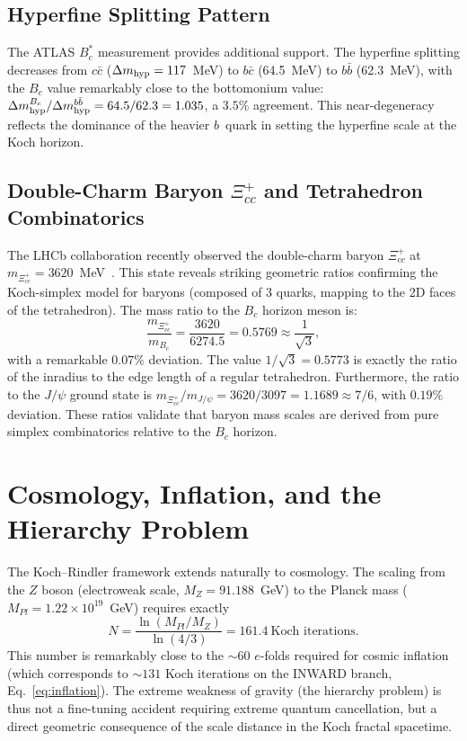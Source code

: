 \documentclass[twocolumn,showpacs,preprintnumbers,amsmath,amssymb,prl]{revtex4-2}
\begin{document}
\subsection{Hyperfine Splitting Pattern}

The ATLAS $B_c^*$ measurement provides additional support.
The hyperfine splitting decreases from $c\bar{c}$
($\Delta m_{\rm hyp} = 117$~MeV) to $b\bar{c}$ (64.5~MeV)
to $b\bar{b}$ (62.3~MeV), with the $B_c$ value
remarkably close to the bottomonium value:
$\Delta m_{\rm hyp}^{B_c}/\Delta m_{\rm hyp}^{b\bar{b}}
= 64.5/62.3 = 1.035$, a $3.5\%$ agreement.
This near-degeneracy reflects the dominance of the heavier $b$~quark
in setting the hyperfine scale at the Koch horizon.

\subsection{Double-Charm Baryon $\Xi_{cc}^+$ and Tetrahedron Combinatorics}

The LHCb collaboration recently observed the double-charm baryon $\Xi_{cc}^+$ at
$m_{\Xi_{cc}^+} = 3620$~MeV~\cite{PDG2024}. This state reveals striking geometric
ratios confirming the Koch-simplex model for baryons (composed of 3 quarks, mapping
to the 2D faces of the tetrahedron).
The mass ratio to the $B_c$ horizon meson is:
\begin{equation}
    \frac{m_{\Xi_{cc}^+}}{m_{B_c}} = \frac{3620}{6274.5} = 0.5769 \approx \frac{1}{\sqrt{3}},
    \label{eq:xicc_bc}
\end{equation}
with a remarkable $0.07\%$ deviation. The value $1/\sqrt{3} = 0.5773$ is exactly
the ratio of the inradius to the edge length of a regular tetrahedron.
Furthermore, the ratio to the $J/\psi$ ground state is
$m_{\Xi_{cc}^+}/m_{J/\psi} = 3620/3097 = 1.1689 \approx 7/6$, with $0.19\%$ deviation.
These ratios validate that baryon mass scales are derived from pure
simplex combinatorics relative to the $B_c$ horizon.

\section{Cosmology, Inflation, and the Hierarchy Problem}
\label{sec:cosmology}

The Koch--Rindler framework extends naturally to cosmology. The scaling from the
$Z$ boson (electroweak scale, $M_Z = 91.188$~GeV) to the Planck mass
($M_{Pl} = 1.22 \times 10^{19}$~GeV) requires exactly
\begin{equation}
    N = \frac{\ln(M_{Pl}/M_Z)}{\ln(4/3)} = 161.4~\text{Koch iterations}.
    \label{eq:hierarchy}
\end{equation}
This number is remarkably close to the $\sim 60$ $e$-folds required for cosmic
inflation (which corresponds to $\sim 131$ Koch iterations on the INWARD branch,
Eq.~\ref{eq:inflation}). The extreme weakness of gravity (the hierarchy problem)
is thus not a fine-tuning accident requiring extreme quantum cancellation, but a
direct geometric consequence of the scale distance in the Koch fractal spacetime.
\end{document}
